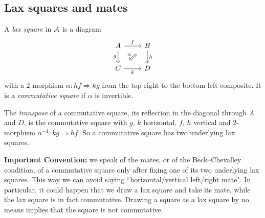 \subsection{Lax squares and mates}
\label{subsec:mates-mates}

\begin{defi}
\label{def:lax-square}
%
A \emph{lax square} in $\mathcal{A}$ is a diagram
\begin{equation*}
\begin{tikzcd}
A \ar[r, "f"] \ar[d, "g"'] & B \ar[d, "h"] \ar[dl, Rightarrow, shorten=3mm,
"\alpha"'] \\
C \ar[r, "k"'] & D
\end{tikzcd}
\end{equation*}
with a $2$-morphism
$\alpha\colon hf \Rightarrow kg$
from the top-right to the bottom-left composite.
It is a \emph{commutative square} if $\alpha$ is invertible.
\end{defi}

%
The \emph{transpose} of a commutative square,
its reflection in the diagonal through $A$ and $D$,
is the commutative square with $g$, $k$ horizontal, $f$,
$h$ vertical and $2$-morphism
$\alpha^{-1}\colon kg \Rightarrow hf$.
So a commutative square has two underlying lax squares.

%
\textbf{Important Convention:} we speak of the mates,
or of the Beck--Chevalley condition,
of a commutative square only after fixing one of its two underlying lax squares.
This way we can avoid saying ``horizontal/vertical left/right mate".
In particular, it could happen that we draw a lax square and take its mate,
while the lax square is in fact commutative.
Drawing a square as a lax square by no means implies that the square is not
commutative.

